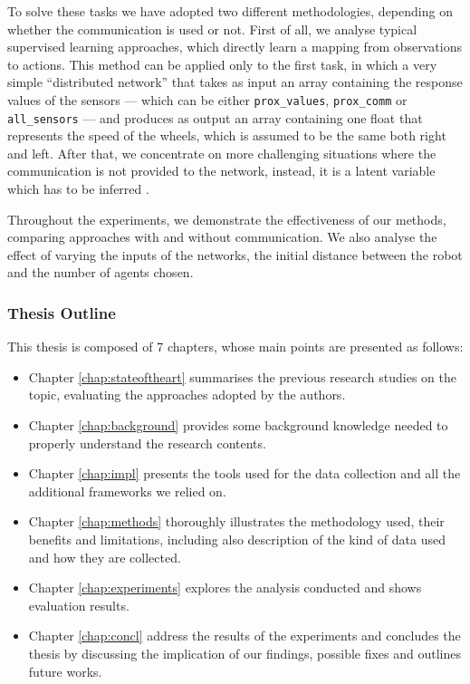 To solve these tasks we have adopted two different methodologies, depending on 
whether the communication is used or not.
First of all, we analyse typical supervised learning approaches, which directly learn 
a mapping from observations to actions. This method can be applied only to the 
first task, in which a very simple ``distributed network'' that takes as input an 
array containing the response values of the sensors — which can be either 
\texttt{prox\_values},  \texttt{prox\_comm} or  \texttt{all\_sensors} — and 
produces as output an array containing one float that represents the speed of the 
wheels, which is assumed to be the same both right and left.
After that, we concentrate on more challenging situations where the 
communication is not provided to the network, instead, it is a latent variable 
which has to be inferred \cite[][]{le2017coordinated}.

Throughout the experiments, we demonstrate the effectiveness of our methods, 
comparing approaches with and without communication. We also analyse the 
effect of varying the inputs of the networks, the initial distance between the robot  
and the number of agents chosen.

\bigskip
\subsubsection*{Thesis Outline}
\label{subsec:outline}

This thesis is composed of 7 chapters, whose main points are presented as follows:
\begin{itemize}
	\item Chapter \ref{chap:stateoftheart} summarises the previous research 
	studies on the topic, evaluating the approaches adopted by the authors.
	
	\item Chapter \ref{chap:background} provides some background knowledge 
	needed to properly understand the research contents.
	
	\item Chapter \ref{chap:impl} presents the tools used for the data collection 
	and all the additional frameworks we relied on.
		
	\item Chapter \ref{chap:methods} thoroughly illustrates the methodology used, 
	their benefits and limitations, including also description of the kind of data 
	used and how they are collected. 

	\item Chapter \ref{chap:experiments} explores the analysis conducted and 
	shows evaluation results.	
	
	\item Chapter \ref{chap:concl} address the results of the experiments and 
	concludes the thesis by discussing the implication of our findings, possible fixes 
	and outlines future works.
	
\end{itemize}

